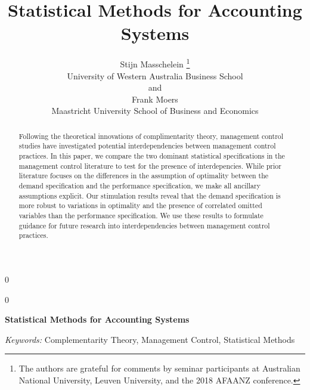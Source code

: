 \documentclass[12pt]{article}
\newcommand{\blind}{0}
\begin{document}
\def\spacingset#1{\renewcommand{\baselinestretch}%
{#1}\small\normalsize} \spacingset{1}


\blind
{
  \title{\bf Statistical Methods for Accounting Systems}

  \author{
        Stijn Masschelein \thanks{The authors are grateful for comments by seminar participants at
Australian National University, Leuven University, and the 2018 AFAANZ
conference.} \\
    University of Western Australia Business School\\
     and \\     Frank Moers \\
    Maastricht University School of Business and Economics\\
      }
  \maketitle
} \fi

\blind
{
  \bigskip
  \bigskip
  \bigskip
  \begin{center}
    {\LARGE\bf Statistical Methods for Accounting Systems}
  \end{center}
  \medskip
} \fi

\bigskip
\begin{abstract}
Following the theoretical innovations of complimentarity theory,
management control studies have investigated potential interdependencies
between management control practices. In this paper, we compare the two
dominant statistical specifications in the management control literature
to test for the presence of interdepencies. While prior literature
focuses on the differences in the assumption of optimality between the
demand specification and the performance specification, we make all
ancillary assumptions explicit. Our stimulation results reveal that the
demand specification is more robust to variations in optimality and the
presence of correlated omitted variables than the performance
specification. We use these results to formulate guidance for future
research into interdependencies between management control practices.
\end{abstract}

\noindent%
{\it Keywords:} Complementarity Theory, Management Control, Statistical Methods
\vfill

\newpage

\spacingset{1.15}
\end{document}
